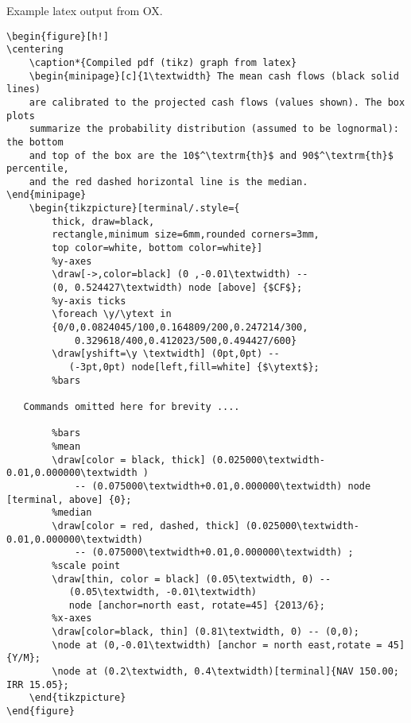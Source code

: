 \documentclass[notitlepage,a4paper]{article}
\begin{document}
Example latex output from OX.
\begin{verbatim}
\begin{figure}[h!]
\centering
    \caption*{Compiled pdf (tikz) graph from latex}
    \begin{minipage}[c]{1\textwidth} The mean cash flows (black solid lines)
    are calibrated to the projected cash flows (values shown). The box plots
    summarize the probability distribution (assumed to be lognormal): the bottom
    and top of the box are the 10$^\textrm{th}$ and 90$^\textrm{th}$ percentile,
    and the red dashed horizontal line is the median. 	 \end{minipage}
    \begin{tikzpicture}[terminal/.style={
        thick, draw=black,
        rectangle,minimum size=6mm,rounded corners=3mm,
        top color=white, bottom color=white}]
        %y-axes
        \draw[->,color=black] (0 ,-0.01\textwidth) --
        (0, 0.524427\textwidth) node [above] {$CF$};
        %y-axis ticks
        \foreach \y/\ytext in
        {0/0,0.0824045/100,0.164809/200,0.247214/300,
            0.329618/400,0.412023/500,0.494427/600}
        \draw[yshift=\y \textwidth] (0pt,0pt) --
           (-3pt,0pt) node[left,fill=white] {$\ytext$};
        %bars

   Commands omitted here for brevity ....

        %bars
        %mean
        \draw[color = black, thick] (0.025000\textwidth-0.01,0.000000\textwidth )
            -- (0.075000\textwidth+0.01,0.000000\textwidth) node [terminal, above] {0};
        %median
        \draw[color = red, dashed, thick] (0.025000\textwidth-0.01,0.000000\textwidth)
            -- (0.075000\textwidth+0.01,0.000000\textwidth) ;
        %scale point
        \draw[thin, color = black] (0.05\textwidth, 0) --
           (0.05\textwidth, -0.01\textwidth)
           node [anchor=north east, rotate=45] {2013/6};
        %x-axes
        \draw[color=black, thin] (0.81\textwidth, 0) -- (0,0);
        \node at (0,-0.01\textwidth) [anchor = north east,rotate = 45] {Y/M};
        \node at (0.2\textwidth, 0.4\textwidth)[terminal]{NAV 150.00; IRR 15.05};
    \end{tikzpicture}
\end{figure}
\end{verbatim}
\end{document}
